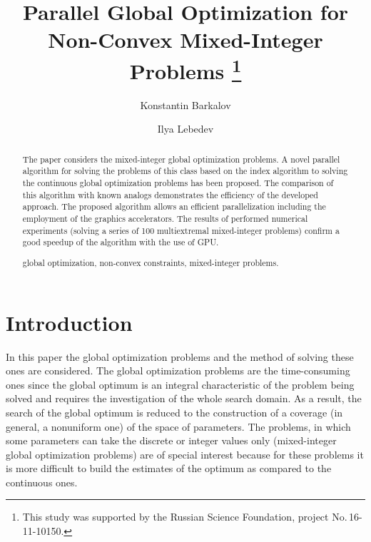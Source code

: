 \documentclass{llncs}
\begin{document}
\mainmatter 

\title{Parallel Global Optimization for Non-Convex Mixed-Integer Problems
\thanks{This study was supported by the Russian Science Foundation, 
project No.\,16-11-10150.}}
\author{Konstantin Barkalov \and Ilya Lebedev %
\\
}


\maketitle

\begin{abstract}

The paper considers the mixed-integer global optimization problems. A novel 
parallel algorithm for solving the problems of this class based on the index 
algorithm to solving the continuous global optimization problems has been proposed. 
The comparison of this algorithm with known analogs demonstrates the efficiency of the 
developed approach. 
The proposed algorithm allows an efficient parallelization including the employment of the 
graphics accelerators. The results of performed numerical experiments (solving a series of 100 multiextremal mixed-integer problems) confirm a good speedup of the algorithm with the use of GPU. 

\keywords global optimization, non-convex constraints, mixed-integer problems.

\end{abstract}

\section{Introduction}\label{sec:intro}

In this paper the global optimization problems and the method of solving these ones are 
considered. The global optimization problems are the time-consuming ones since the global 
optimum is an integral characteristic of the problem being solved and requires the investigation 
of the whole search domain. 
As a result, the search of the global optimum is reduced to the construction of a coverage (in 
general, a nonuniform one) of the space of parameters. 
The problems, in which some parameters can take the discrete or integer values only (mixed-integer global 
optimization problems) are of special interest because for these problems it is more difficult to build 
the estimates of the optimum as compared to the continuous ones.
\end{document}

